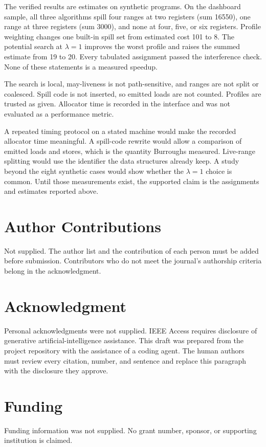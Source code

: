 \documentclass{ieeeaccess}
\begin{document}
The verified results are estimates on synthetic programs.
On the dashboard sample, all three algorithms spill four ranges at two registers (sum 16550), one range at three registers (sum 3000), and none at four, five, or six registers.
Profile weighting changes one built-in spill set from estimated cost 101 to 8.
The potential search at $\lambda = 1$ improves the worst profile and raises the summed estimate from 19 to 20.
Every tabulated assignment passed the interference check.
None of these statements is a measured speedup.

The search is local, may-liveness is not path-sensitive, and ranges are not split or coalesced.
Spill code is not inserted, so emitted loads are not counted.
Profiles are trusted as given.
Allocator time is recorded in the interface and was not evaluated as a performance metric.

A repeated timing protocol on a stated machine would make the recorded allocator time meaningful.
A spill-code rewrite would allow a comparison of emitted loads and stores, which is the quantity Burroughs measured.
Live-range splitting would use the identifier the data structures already keep.
A study beyond the eight synthetic cases would show whether the $\lambda = 1$ choice is common.
Until those measurements exist, the supported claim is the assignments and estimates reported above.

\section*{Author Contributions}
Not supplied.
The author list and the contribution of each person must be added before submission.
Contributors who do not meet the journal's authorship criteria belong in the acknowledgment.

\section*{Acknowledgment}
Personal acknowledgments were not supplied.
IEEE Access requires disclosure of generative artificial-intelligence assistance.
This draft was prepared from the project repository with the assistance of a coding agent.
The human authors must review every citation, number, and sentence and replace this paragraph with the disclosure they approve.

\section*{Funding}
Funding information was not supplied.
No grant number, sponsor, or supporting institution is claimed.
\end{document}
